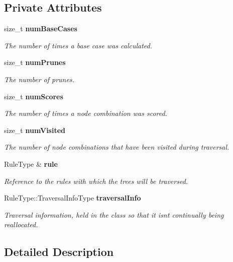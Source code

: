 \subsection*{Private Attributes}
\begin{DoxyCompactItemize}
\item 
size\+\_\+t {\bf num\+Base\+Cases}
\begin{DoxyCompactList}\small\item\em The number of times a base case was calculated. \end{DoxyCompactList}\item 
size\+\_\+t {\bf num\+Prunes}
\begin{DoxyCompactList}\small\item\em The number of prunes. \end{DoxyCompactList}\item 
size\+\_\+t {\bf num\+Scores}
\begin{DoxyCompactList}\small\item\em The number of times a node combination was scored. \end{DoxyCompactList}\item 
size\+\_\+t {\bf num\+Visited}
\begin{DoxyCompactList}\small\item\em The number of node combinations that have been visited during traversal. \end{DoxyCompactList}\item 
Rule\+Type \& {\bf rule}
\begin{DoxyCompactList}\small\item\em Reference to the rules with which the trees will be traversed. \end{DoxyCompactList}\item 
Rule\+Type\+::\+Traversal\+Info\+Type {\bf traversal\+Info}
\begin{DoxyCompactList}\small\item\em Traversal information, held in the class so that it isn\textquotesingle{}t continually being reallocated. \end{DoxyCompactList}\end{DoxyCompactItemize}


\subsection{Detailed Description}
